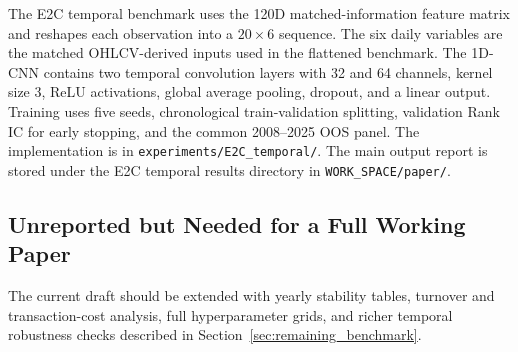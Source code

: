 The E2C temporal benchmark uses the 120D matched-information feature matrix and reshapes each observation into a $20\times 6$ sequence. The six daily variables are the matched OHLCV-derived inputs used in the flattened benchmark. The 1D-CNN contains two temporal convolution layers with 32 and 64 channels, kernel size 3, ReLU activations, global average pooling, dropout, and a linear output. Training uses five seeds, chronological train-validation splitting, validation Rank IC for early stopping, and the common 2008--2025 OOS panel. The implementation is in \texttt{experiments/E2C\_temporal/}. The main output report is stored under the E2C temporal results directory in \texttt{WORK\_SPACE/paper/}.

\subsection{Unreported but Needed for a Full Working Paper}

The current draft should be extended with yearly stability tables, turnover and transaction-cost analysis, full hyperparameter grids, and richer temporal robustness checks described in Section~\ref{sec:remaining_benchmark}.
